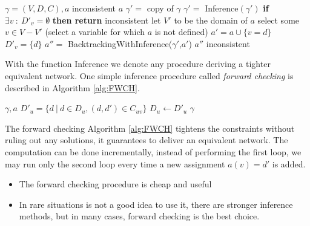 \documentclass[10pt, letterpaper]{report}
\begin{document}
\begin{algorithm}
    \caption{BacktrackingWithInference}\label{alg:BacktrackingWithInference}
    \begin{algorithmic}
    \Require $\gamma=(V,D,C),a$
     \State\Return inconsistent\EndIf
     \State\Return $a$\EndIf
    \State $\gamma'=$ copy of $\gamma$
    \State \color{sapienza}$\gamma'=$ Inference$(\gamma')$\color{black}
    \State\textbf{if} $\exists v \ : \ D'_v=\emptyset$ \textbf{ then return } inconsistent
    \State let $V'$ to be the domain of $a$
    \State select \color{blue} some  \color{black} $v\in V-V'$ (select a variable for which $a$ is not defined)
    \State $a'=a\cup \{v=d\}$
    \State $D'_v=\{d\}$
    \State $a''=$ BacktrackingWithInference($\gamma'$,$a'$)
     \State\Return $a''$\EndIf
    \EndFor
    \State\Return inconsistent
    \end{algorithmic}
\end{algorithm}
With the function \color{sapienza}Inference \color{black} we denote any procedure deriving a tighter equivalent network. One simple inference procedure called \textit{forward checking} is described in Algorithm \ref{alg:FWCH}.\bigskip 

\begin{algorithm}
    \caption{Forward Checking}\label{alg:FWCH}
    \begin{algorithmic}
    \Require $\gamma,a$
    \State $D'_u=\{d \ | \ d\in D_u, (d,d')\in C_{uv}\}$
    \State $D_u\leftarrow D'_u$ 
    \EndFor 
    \EndFor 
     \State\Return $\gamma$
    \end{algorithmic}
\end{algorithm}

The forward checking Algorithm \ref{alg:FWCH} tightens the constraints without ruling out any solutions, it guarantees to deliver an equivalent network. The computation can be done incrementally, instead of performing the first loop, we may run only the second loop every time a new assignment $a(v)=d'$ is added.\begin{itemize}
    \item The forward checking procedure is cheap and useful 
    \item In rare situations is not a good idea to use it, there are stronger inference methods, but in many cases, forward checking is the best choice.
\end{itemize}
\end{document}
